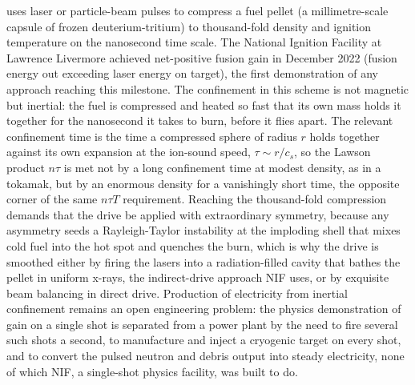  uses laser or particle-beam pulses to
compress a fuel pellet (a millimetre-scale capsule of frozen
deuterium-tritium) to thousand-fold density and ignition temperature
on the nanosecond time scale. The National Ignition Facility at
Lawrence Livermore achieved net-positive fusion gain in December
2022 (fusion energy out exceeding laser energy on target), the first
demonstration of any approach reaching this milestone. The confinement
in this scheme is not magnetic but inertial: the fuel is compressed and
heated so fast that its own mass holds it together for the nanosecond it
takes to burn, before it flies apart. The relevant confinement time is
the time a compressed sphere of radius $r$ holds together against its own
expansion at the ion-sound speed, $\tau \sim r/c_s$, so the Lawson
product $n\tau$ is met not by a long confinement time at modest density,
as in a tokamak, but by an enormous density for a vanishingly short time,
the opposite corner of the same $n\tau T$ requirement. Reaching the
thousand-fold compression demands that the drive be applied with
extraordinary symmetry, because any asymmetry seeds a Rayleigh-Taylor
instability at the imploding shell that mixes cold fuel into the hot spot
and quenches the burn, which is why the drive is smoothed either by
firing the lasers into a radiation-filled cavity that bathes the pellet
in uniform x-rays, the indirect-drive approach NIF uses, or by exquisite
beam balancing in direct drive. Production of electricity from inertial
confinement remains an open engineering problem: the physics
demonstration of gain on a single shot is separated from a power plant by
the need to fire several such shots a second, to manufacture and inject a
cryogenic target on every shot, and to convert the pulsed neutron and
debris output into steady electricity, none of which NIF, a single-shot
physics facility, was built to do.




